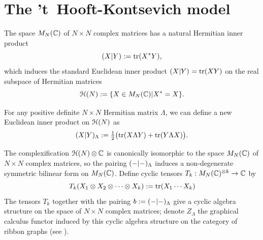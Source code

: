 \documentclass[11pt,twoside]{article}
\theoremstyle{plain}
\theoremstyle{remark}
\theoremstyle{definition}
\numberwithin{equation}{section} %
\newcommand{\Hermitian}[1][\relax]{{\mathcal H}\ifx#1\relax\relax\else(#1)\fi}
\begin{document}
\section{The 't~Hooft-Kontsevich model}
\label{sec:tHooft}

The space $M_N(\setC)$ of $N\times N$ complex matrices  has a natural
Hermitian inner product
\begin{equation*} 
  \inner{X}{Y}:=\tr(X^*Y),
\end{equation*}
which induces the standard Euclidean inner product \(\inner{X}{Y} =
\tr(XY)\) on the real subspace of Hermitian matrices
\begin{equation*}
  \Hermitian[N] :=\{X\in M_N(\setC) | X^*=X\}.
\end{equation*}

For any positive definite $N\times N$ Hermitian matrix \(\Lambda\), we
can define a new Euclidean inner product on \(\Hermitian[N]\) as
\begin{equation*}
  \inner[\Lambda]{X}{Y} := 
  {\textstyle\onehalf} \bigl( \tr(X\Lambda Y) + \tr(Y\Lambda X) \bigr).
\end{equation*}

The complexification ${\Hermitian[N]}\otimes \setC$ is canonically
isomorphic to the space $M_N(\setC)$ of $N \times N$ complex matrices,
so the pairing $\inner[\Lambda]{-}{-}$ induces a non-degenerate
symmetric bilinear form on $M_N(\setC)$. Define cyclic tensors
$T_k:M_N(\setC)\tp{k} \to \setC$ by
\begin{equation*}
  T_{k}(X_1\otimes X_2\otimes\cdots\otimes X_{k}) := 
  \tr(X_1\cdots X_k)
\end{equation*} 
The tensors \(T_k\) together with the pairing $b :=
\inner[\Lambda]{-}{-}$ give a cyclic algebra structure on the space of
$N\times N$ complex matrices; denote $Z_\Lambda$ the graphical calculus
functor induced by this cyclic algebra structure on the category of
ribbon graphs (see ).
\end{document}
